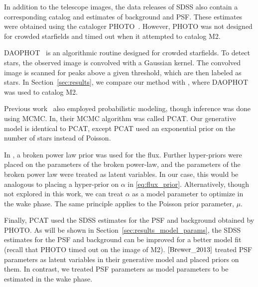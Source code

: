In addition to the telescope images, the data releases of SDSS also contain 
a corresponding catalog and estimates of background and PSF. These estimates were obtained using the cataloger PHOTO~\cite{lupton2001sdss}. However, PHOTO was not designed for crowded starfields and timed out when it attempted to catalog M2. 

DAOPHOT~\cite{stetson2987daophot} is an algorithmic routine designed for crowded starfields. To detect stars, the observed image is convolved with a Gaussian kernel. The convolved image is scanned for peaks above a given threshold, which are then labeled as stars. In Section~\ref{sec:results}, we compare our method with \cite{An_2008_m2}, where DAOPHOT was used to catalog M2. 

Previous work~\cite{Brewer_2013, Portillo_2017, Feder_2019} also employed probabilistic modeling, though inference was done using MCMC. In, \cite{Portillo_2017, Feder_2019} their MCMC algorithm was called PCAT. Our generative model is identical to PCAT, except PCAT used an exponential prior on the number of stars instead of Poisson. 

In \cite{Brewer_2013}, a broken power law prior was used for the flux. 
Further hyper-priors were placed on the parameters of the broken power-law, and the parameters of the broken power law were treated as latent variables. In our case, this would be analogous to placing a hyper-prior on $\alpha$ in \eqref{eq:flux_prior}. Alternatively, though not explored in this work, we can treat $\alpha$ as a model parameter to optimize in the wake phase. The same principle applies to the Poisson prior parameter, $\mu$. 

Finally, PCAT used the SDSS estimates for the PSF and background obtained by PHOTO.
As will be shown in Section~\ref{sec:results_model_params}, the SDSS estimates for the PSF and background can be improved for a better model fit (recall that PHOTO timed out 
on the image of M2). $\cite{Brewer_2013}$ treated PSF parameters as latent variables in their generative model and placed priors on them. In contrast, we treated PSF parameters as model parameters to be estimated in the wake phase. 

